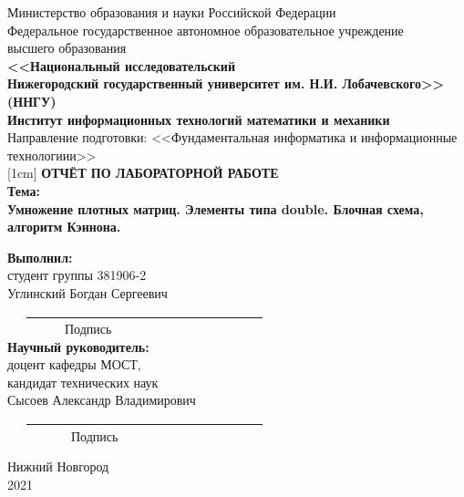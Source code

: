 \documentclass[12pt, letterpaper]{article}
\begin{document}
\begin{titlepage}
\begin{center} 
Министерство образования и науки Российской Федерации\\
Федеральное государственное автономное образовательное учреждение  \\
высшего образования\\
\textbf{<<Национальный исследовательский\\Нижегородский государственный университет им. Н.И. Лобачевского>>}\\
\textbf{(ННГУ)}\\[0.5cm]
\textbf{Институт информационных технологий математики и механики}\\[0.5cm]
Направление подготовки: <<Фундаментальная информатика и информационные технологиии>>\\
[1cm]
\textbf{\large ОТЧЁТ ПО ЛАБОРАТОРНОЙ РАБОТЕ} \\[0.6cm]
\textbf{Тема:}\\
  \textbf{\large Умножение плотных матриц. Элементы типа double. Блочная схема, алгоритм Кэннона. }\\[2.5cm]
 
\begin{flushright}
 \begin{minipage}{0.55\textwidth}
 \begin{flushleft} 
 \textbf{Выполнил:} \\
 студент группы 381906-2\\
 Углинский Богдан Сергеевич\\
\ \ \ \underline{\ \ \ \ \ \ \ \ \ \ \ \ \ \ \ \ \ \ \ \ \ \ \ \ \ \ \ \ \ \ \ \ \ \ \ \ \ }\\
   \ \ \ \ \ \ \ \ \ Подпись\\[0.5cm]
 \textbf{Научный руководитель:}\\
 доцент кафедры МОСТ,\\
 кандидат технических наук\\
 Сысоев Александр Владимирович \\
 \ \ \ \underline{\ \ \ \ \ \ \ \ \ \ \ \ \ \ \ \ \ \ \ \ \ \ \ \ \ \ \ \ \ \ \ \ \ \ \ \ \ }\\
 \ \ \ \ \ \ \ \ \ \ Подпись\\[0.5cm]
 \end{flushleft} 
 \end{minipage} 
\end{flushright}
 \vfill 
 
  Нижний Новгород \\
 2021

 \thispagestyle{empty} 

\end{center}
\end{titlepage}
\newpage
\renewcommand*\contentsname{Оглавление}
\tableofcontents
\newpage
\end{document}
